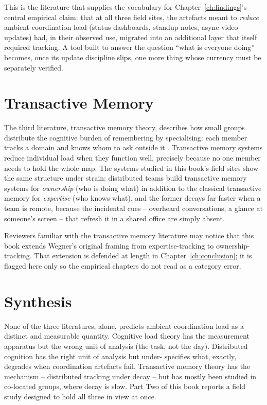This is the literature that supplies the vocabulary for
Chapter~\ref{ch:findings}'s central empirical claim: that at all three
field sites, the artefacts meant to \emph{reduce} ambient coordination load
(status dashboards, standup notes, async video updates) had, in their
observed use, migrated into an additional layer that itself required
tracking. A tool built to answer the question ``what is everyone doing''
becomes, once its update discipline slips, one more thing whose currency
must be separately verified.

\section{Transactive Memory}

The third literature, transactive memory theory,
describes how small groups distribute the cognitive burden of remembering
by specialising: each member tracks a domain and knows whom to ask outside
it \citep{wegner1986transactive}. Transactive memory systems reduce
individual load when they function well, precisely because no one member
needs to hold the whole map. The systems studied in this book's field sites
show the same structure under strain: distributed teams build transactive
memory systems for \emph{ownership} (who is doing what) in addition to the
classical transactive memory for \emph{expertise} (who knows what), and the
former decays far faster when a team is remote, because the incidental
cues -- overheard conversations, a glance at someone's screen -- that
refresh it in a shared office are simply absent.

\begin{editorialnote}
Reviewers familiar with the transactive memory literature may notice that
this book extends Wegner's original framing from expertise-tracking to
ownership-tracking. That extension is defended at length in
Chapter~\ref{ch:conclusion}; it is flagged here only so the empirical
chapters do not read as a category error.
\end{editorialnote}

\section{Synthesis}

None of the three literatures, alone, predicts ambient coordination load as
a distinct and measurable quantity. Cognitive load theory has the
measurement apparatus but the wrong unit of analysis (the task, not the
day). Distributed cognition has the right unit of analysis but under-
specifies what, exactly, degrades when coordination artefacts fail.
Transactive memory theory has the mechanism -- distributed tracking under
decay -- but has mostly been studied in co-located groups, where decay is
slow. Part Two of this book reports a field study designed to hold all
three in view at once.
